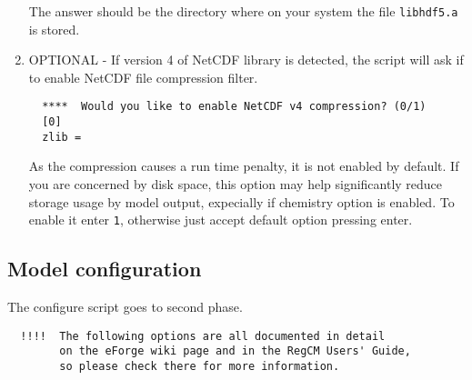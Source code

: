 \begin{enumerate}
The answer should be the directory where on your system the file
\verb=libhdf5.a= is stored.
\item OPTIONAL - If version 4 of NetCDF library is detected, the script
will ask if to enable NetCDF file compression filter.
\begin{Verbatim}
  ****  Would you like to enable NetCDF v4 compression? (0/1)
  [0]
  zlib =
\end{Verbatim}
As the compression causes a run time penalty, it is not enabled by
default. If you are concerned by disk space, this option may help
significantly reduce storage usage by model output, expecially if
chemistry option is enabled. To enable it enter \verb=1=, otherwise
just accept default option pressing enter.
\end{enumerate}

\subsection{Model configuration}

The configure script goes to second phase.

\begin{Verbatim}
  !!!!  The following options are all documented in detail 
        on the eForge wiki page and in the RegCM Users' Guide,
        so please check there for more information.
\end{Verbatim}

